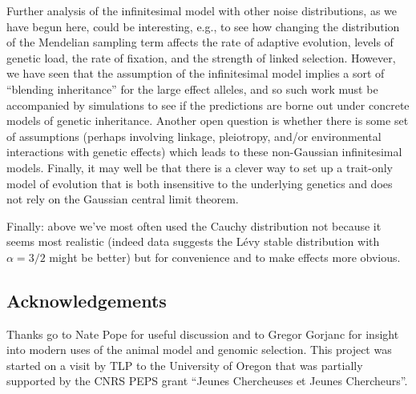 \documentclass{article}
\newcommand{\1}{\mathbbm{1}}
\theoremstyle{remark}
\theoremstyle{definition}
\begin{document}
Further analysis of the infinitesimal model with other noise distributions,
as we have begun here,
could be interesting,
e.g., to see how changing the distribution of the Mendelian sampling term
affects the rate of adaptive evolution,
levels of genetic load,
the rate of fixation,
and the strength of linked selection.
However,
we have seen that the assumption of the infinitesimal model
implies a sort of ``blending inheritance''
for the large effect alleles,
and so such work must be accompanied by simulations
to see if the predictions are borne out under concrete models of genetic inheritance.
Another open question is whether there is some set of assumptions
(perhaps involving linkage, pleiotropy, and/or environmental interactions with genetic effects)
which leads to these non-Gaussian infinitesimal models.
Finally, it may well be that there is a clever way to set up a trait-only model of evolution
that is both insensitive to the underlying genetics
and does not rely on the Gaussian central limit theorem.

Finally: above we've most often used the Cauchy distribution
not because it seems most realistic
(indeed data suggests the L\'evy stable distribution with $\alpha=3/2$ might be better)
but for convenience and to make effects more obvious.

\subsection*{Acknowledgements}
Thanks go to Nate Pope for useful discussion
and to Gregor Gorjanc for insight into modern uses
of the animal model and genomic selection.  This project was started on a visit by TLP to the University of Oregon that was partially supported by the CNRS PEPS grant ``Jeunes Chercheuses et Jeunes Chercheurs''.




\appendix
\setcounter{table}{0}
\renewcommand{\thetable}{S\arabic{table}}
\setcounter{figure}{0}
\renewcommand{\thefigure}{S\arabic{figure}}
\end{document}
